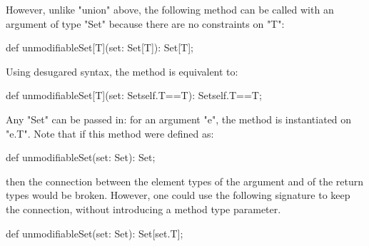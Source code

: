 However, unlike \xcd"union" above,
the following method can be called with an argument of type \xcd"Set"
because there are no constraints on \xcd"T":
\begin{xten}
def unmodifiableSet[T](set: Set[T]): Set[T];
\end{xten}

Using desugared syntax, the method is
equivalent to: 
\begin{xten}
def unmodifiableSet[T](set: Set{self.T==T}): Set{self.T==T};
\end{xten}
Any \xcd"Set" can be passed in: for an argument \xcd"e", the method
is instantiated on \xcd"e.T".
%
Note that if this method were defined as:
\begin{xten}
def unmodifiableSet(set: Set): Set;
\end{xten}
then the connection between the element types of the
argument and of the return types would be broken.
However, one could use the following signature to keep the
connection, without introducing a method type parameter. 
\begin{xten}
def unmodifiableSet(set: Set): Set[set.T];
\end{xten}
